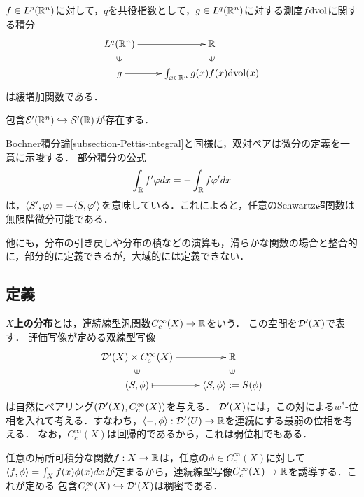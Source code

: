 \documentclass[uplatex,dvipdfmx]{jsreport}
\begin{document}
\begin{example}
    $f\in L^p(\mathbb{R}^n)$に対して，$q$を共役指数として，$g\in L^q(\mathbb{R}^n)$に対する測度$f\mathrm{dvol}$に関する積分
    \[\xymatrix@R-2pc{
        L^q(\R^n)\ar[r]&\R\\
        \rotatebox[origin=c]{90}{$\in$}&\rotatebox[origin=c]{90}{$\in$}\\
        g\ar@{|->}[r]&\int_{x\in\R^n}g(x)f(x)\dvol(x)
    }\]
    は緩増加関数である．
\end{example}

\begin{theorem}
    包含$\mathcal{E}'(\mathbb{R}^n)\hookrightarrow\mathcal{S}'(\mathbb{R})$が存在する．
\end{theorem}

\begin{discussion}[双対ペアと微分]
    Bochner積分論\ref{subsection-Pettis-integral}と同様に，双対ペアは微分の定義を一意に示唆する．
    部分積分の公式
    \[\int_{\mathbb{R}} f'\varphi dx=-\int_{\mathbb{R}} f\varphi'dx\]
    は，$\langle S',\varphi\rangle=-\langle S,\varphi'\rangle$を意味している．これによると，任意のSchwartz超関数は無限階微分可能である．
\end{discussion}

\begin{discussion}[その他の操作と演算]
    他にも，分布の引き戻しや分布の積などの演算も，滑らかな関数の場合と整合的に，部分的に定義できるが，大域的には定義できない．
\end{discussion}

\subsection{定義}

\begin{definition}[distribution on $X$]
    \textbf{$X$上の分布}とは，連続線型汎関数$C_c^\infty(X)\to\mathbb{R}$をいう．
    この空間を$\mathcal{D}'(X)$で表す．
    評価写像が定める双線型写像
    \[\xymatrix@R-2pc{
        \D'(X)\times C^\infty_c(X)\ar[r]&\R\\
        \rotatebox[origin=c]{90}{$\in$}&\rotatebox[origin=c]{90}{$\in$}\\
        (S,\phi)\ar@{|->}[r]&\brac{S,\phi}:=S(\phi)
    }\]
    は自然にペアリング$(\mathcal{D}'(X),C_c^\infty(X))$を与える．
    $\mathcal{D}'(X)$には，この対による$w^*$-位相を入れて考える．すなわち，$\langle-,\phi\rangle:\mathcal{D}'(U)\to\mathbb{R}$を連続にする最弱の位相を考える．
    なお，$C^\infty_c(X)$は回帰的であるから，これは弱位相でもある．
\end{definition}

\begin{example}
    任意の局所可積分な関数$f:X\to\mathbb{R}$は，任意の$\phi\in C_c^\infty(X)$に対して
    $\langle f,\phi\rangle=\int_Xf(x)\phi(x)dx$が定まるから，連続線型写像$C_c^\infty(X)\to\mathbb{R}$を誘導する．これが定める
    包含$C_c^\infty(X)\hookrightarrow\mathcal{D}'(X)$は稠密である．
\end{example}
\end{document}
